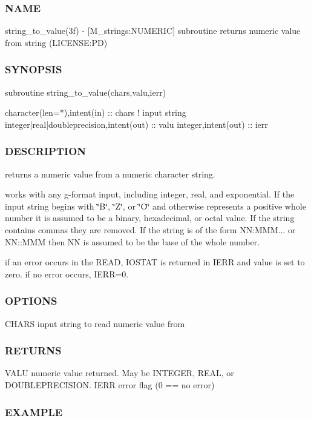 \subsubsection*{N\+A\+ME}

string\+\_\+to\+\_\+value(3f) -\/ \mbox{[}M\+\_\+strings\+:N\+U\+M\+E\+R\+IC\mbox{]} subroutine returns numeric value from string (L\+I\+C\+E\+N\+SE\+:PD) 

\subsubsection*{S\+Y\+N\+O\+P\+S\+IS}

\begin{DoxyVerb}subroutine string_to_value(chars,valu,ierr)

 character(len=*),intent(in)              :: chars   ! input string
 integer|real|doubleprecision,intent(out) :: valu
 integer,intent(out)                      :: ierr
\end{DoxyVerb}
 \subsubsection*{D\+E\+S\+C\+R\+I\+P\+T\+I\+ON}

returns a numeric value from a numeric character string.

works with any g-\/format input, including integer, real, and exponential. If the input string begins with \char`\"{}\+B\char`\"{}, \char`\"{}\+Z\char`\"{}, or \char`\"{}\+O\char`\"{} and otherwise represents a positive whole number it is assumed to be a binary, hexadecimal, or octal value. If the string contains commas they are removed. If the string is of the form NN\+:M\+MM... or N\+N\+::\+M\+MM then NN is assumed to be the base of the whole number.

if an error occurs in the R\+E\+AD, I\+O\+S\+T\+AT is returned in I\+E\+RR and value is set to zero. if no error occurs, I\+E\+RR=0. \subsubsection*{O\+P\+T\+I\+O\+NS}

C\+H\+A\+RS input string to read numeric value from \subsubsection*{R\+E\+T\+U\+R\+NS}

V\+A\+LU numeric value returned. May be I\+N\+T\+E\+G\+ER, R\+E\+AL, or D\+O\+U\+B\+L\+E\+P\+R\+E\+C\+I\+S\+I\+ON. I\+E\+RR error flag (0 == no error) \subsubsection*{E\+X\+A\+M\+P\+LE}

